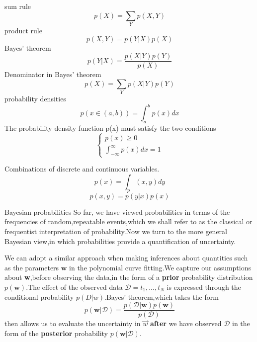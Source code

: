 sum rule
\begin{equation}
                                  p(X) = \sum_{Y}p(X,Y)
\end{equation}
product rule
\begin{equation}
                                  p(X,Y) = p(Y|X)p(X)
\end{equation}
Bayes' theorem
\begin{equation}
                                  p(Y|X) = \frac{p(X|Y)p(Y)}{p(X)}
\end{equation}
Denominator in Bayes' theorem
\begin{equation}
                                  p(X) = \sum_Y{p(X|Y)p(Y)}
\end{equation}
probability densities
\begin{equation}
                         p(x\in (a,b)) = \int_{a}^{b}p(x)dx
\end{equation}
The probability density function p(x) must satisfy the two conditions
\begin{equation}
\begin{cases}
                                  p(x) \geq 0               \\
                                  \int_{-\infty}^{\infty}p(x)dx = 1
\end{cases}
\end{equation}

Combinations of discrete and continuous variables.
\begin{equation}
                                  p(x) = \int_p(x,y)dy	
\end{equation}
\begin{equation}
                                  p(x,y) = p(y|x)p(x)
\end{equation}


Bayesian probabilities
So far, we have viewed probabilities in terms of the frequencies of random,repeatable events,which we shall refer to as the classical or frequentist interpretation of probability.Now we turn to the more general Bayesian view,in which probabilities provide a quantification of uncertainty.

We can adopt a similar approach when making inferences about quantities such as the parameters $\mathbf{w}$ in the polynomial curve fitting.We capture our assumptions about \textbf{w},before observing the data,in the form of a \textbf{prior} probability distribution $p(\mathbf{w})$.The effect of the observed data $\mathcal{D} = {t_1,...,t_N}$ is expressed through the conditional probability $p(D|w)$.Bayes' theorem,which takes the form
\begin{equation}
p(\textbf{w}|\mathcal{D}) = \frac{p(\mathcal{D}|\textbf{w})p(\textbf{w})}{p(\mathcal{D})}
\end{equation}
then allows us to evaluate the uncertainty in $\vec{w}$ \textbf{after} we have observed $\mathcal{D}$ in the form of the \textbf{posterior} probability $p(\mathbf{w}|\mathcal{D})$.

